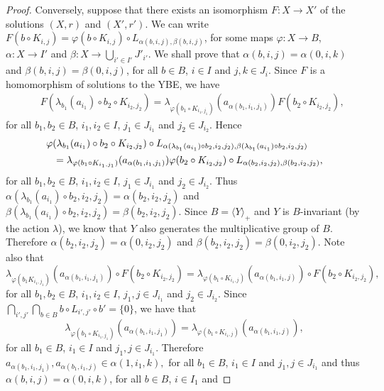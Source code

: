 \begin{proof}
	Conversely, suppose that there exists an isomorphism $F\colon
	X\rightarrow X'$ of the solutions $(X,r)$ and $(X',r')$. We can
	write $F(b\circ K_{i,j})=\varphi(b\circ K_{i,j})\circ L_{\alpha(b,i,j),\beta(b,i,j)}$,
	for some maps $\varphi\colon X\rightarrow B$, $\alpha\colon
	X\rightarrow I'$ and $\beta \colon X\rightarrow \bigcup_{i'\in
		I'}J'_{i'}$. We shall prove that $\alpha(b,i,j)=\alpha(0,i,k)$ and
	$\beta(b,i,j)=\beta(0,i,j)$, for all $b\in B$, $i\in I$ and $j,k\in
	J_i$. Since $F$ is a homomorphism of solutions to the YBE, we have
	\begin{eqnarray}\label{F}
		&&F(\lambda_{b_1}(a_{i_1})\circ b_2\circ K_{i_2,j_2})
		=\lambda_{\varphi(b_1\circ K_{i_1,j_1})}(a_{\alpha(b_1,i_1,j_1)})F(b_2\circ K_{i_2,j_2}),\end{eqnarray}
	for all $b_1,b_2\in B$, $i_1,i_2\in I$,  $j_1\in J_{i_1}$ and
	$j_2\in J_{i_2}$. Hence
	\begin{eqnarray*}\lefteqn{\varphi(\lambda_{b_1}(a_{i_1})\circ b_2\circ K_{i_2,j_2})\circ L_{\alpha(\lambda_{b_1}(a_{i_1})\circ b_2,i_2,j_2),\beta(\lambda_{b_1}(a_{i_1})\circ b_2,i_2,j_2)}}
		\\
		&&=\lambda_{\varphi(b_1\circ K_{i_1,j_1})}(a_{\alpha(b_1,i_1,j_1)})\varphi(b_2\circ K_{i_2,j_2})\circ L_{\alpha(b_2,i_2,j_2),\beta(b_2,i_2,j_2)},\end{eqnarray*}
	for all $b_1,b_2\in B$, $i_1,i_2\in I$,  $j_1\in J_{i_1}$ and
	$j_2\in J_{i_2}$. Thus
	$\alpha(\lambda_{b_1}(a_{i_1})\circ b_2,i_2,j_2)=\alpha(b_2,i_2,j_2)$ and
	$\beta(\lambda_{b_1}(a_{i_1})\circ b_2,i_2,j_2)=\beta(b_2,i_2,j_2)$. Since
	$B=\langle Y\rangle_+$ and $Y$ is $B$-invariant (by the action
	$\lambda$), we know that $Y$ also generates the multiplicative group
	of $B$. Therefore $\alpha(b_2,i_2,j_2)=\alpha(0,i_2,j_2)$ and
	$\beta(b_2,i_2,j_2)=\beta(0,i_2,j_2)$. Note also that
	$$\lambda_{\varphi(b_1K_{i_1,j_1})}(a_{\alpha(b_1,i_1,j_1)})\circ F(b_2\circ K_{i_2,j_2})=\lambda_{\varphi(b_1\circ K_{i_1,j})}(a_{\alpha(b_1,i_1,j)})\circ F(b_2\circ K_{i_2,j_2}),$$
	for all $b_1,b_2\in B$, $i_1,i_2\in I$,  $j_1,j\in J_{i_1}$ and
	$j_2\in J_{i_2}$. Since $\bigcap_{i',j'}\bigcap_{b\in
		B}b\circ L_{i',j'}\circ b'=\{ 0\}$, we have that
	$$\lambda_{\varphi(b_1\circ K_{i_1,j_1})}(a_{\alpha(b_1,i_1,j_1)})=\lambda_{\varphi(b_1\circ K_{i_1,j})}(a_{\alpha(b_1,i_1,j)}),$$
	for all $b_1\in B$, $i_1\in I$ and  $j_1,j\in J_{i_1}$. Therefore
	$a_{\alpha(b_1,i_1,j_1)},a_{\alpha(b_1,i_1,j)}\in \alpha(1,i_1,k),$
	for all $b_1\in B$, $i_1\in I$ and $j_1,j\in J_{i_1}$ and thus
	$\alpha(b,i,j)=\alpha(0,i,k)$, for all $b\in B$, $i\in I_1$ and

\end{proof}
